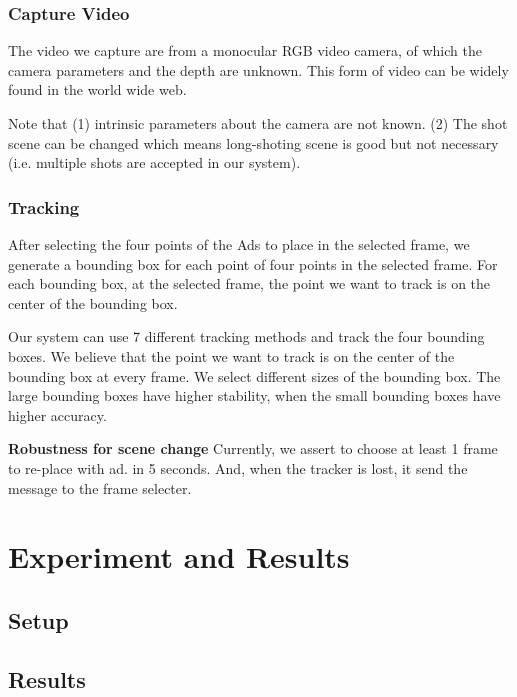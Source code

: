 \documentclass{sig-alternate}
\begin{document}
\subsubsection{Capture Video}
The video we capture are from a monocular RGB video camera, of which the camera parameters and the depth are unknown. This form of video can be widely found in the world wide web. 

Note that (1) intrinsic parameters about the camera are not known. (2) The shot scene can be changed which means long-shoting scene is good but not necessary (i.e. multiple shots are accepted in our system).

\subsubsection{Tracking}

After selecting the four points of the Ads to place in the selected frame, we generate a bounding box for each point of four points in the selected frame. For each bounding box, at the selected frame, the point we want to track is on the center of the bounding box. 


Our system can use 7 different tracking methods and track the four bounding boxes. 
We believe that the point we want to track is on the center of the bounding box at every frame. 
We select different sizes of the bounding box. The large bounding boxes have higher stability, when the small bounding boxes have higher accuracy. 



\textbf{Robustness for scene change} Currently, we assert to choose at least 1 frame to re-place with ad. in 5 seconds. 
And, when the tracker is lost, it send the message to the frame selecter. 


\section{Experiment and Results}
\label{sec:expr}

\subsection{Setup}


\subsection{Results}
\label{sec:result}
\end{document}
